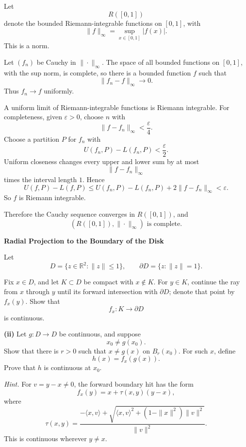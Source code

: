\begin{solution}
Let
\[
R([0,1])
\]
denote the bounded Riemann-integrable functions on \([0,1]\), with
\[
\|f\|_\infty=\sup_{x\in[0,1]}|f(x)|.
\]
This is a norm.

Let \((f_n)\) be Cauchy in \(\|\cdot\|_\infty\). The space of all bounded functions on
\([0,1]\), with the sup norm, is complete, so there is a bounded function \(f\) such that
\[
\|f_n-f\|_\infty\to0.
\]
Thus \(f_n\to f\) uniformly.

A uniform limit of Riemann-integrable functions is Riemann integrable. For completeness,
given \(\varepsilon>0\), choose \(n\) with
\[
\|f-f_n\|_\infty<\frac{\varepsilon}{4}.
\]
Choose a partition \(P\) for \(f_n\) with
\[
U(f_n,P)-L(f_n,P)<\frac{\varepsilon}{2}.
\]
Uniform closeness changes every upper and lower sum by at most
\[
\|f-f_n\|_\infty
\]
times the interval length \(1\). Hence
\[
U(f,P)-L(f,P)
\le
U(f_n,P)-L(f_n,P)
+
2\|f-f_n\|_\infty
<
\varepsilon.
\]
So \(f\) is Riemann integrable.

Therefore the Cauchy sequence converges in \(R([0,1])\), and
\[
\boxed{
(R([0,1]),\|\cdot\|_\infty)
\text{ is complete}.
}
\]
\end{solution}


\begin{problem}[CP-II-0508]
\label{prob:cp-ii-0508}
\textbf{Radial Projection to the Boundary of the Disk}

\hspace*{1.5em}Let
\[
D=\{z\in\mathbb R^2:\|z\|\le1\},
\qquad
\partial D=\{z:\|z\|=1\}.
\]


Fix \(x\in D\), and let \(K\subset D\) be compact with \(x\notin K\). For
\(y\in K\), continue the ray from \(x\) through \(y\) until its forward
intersection with \(\partial D\); denote that point by \(f_x(y)\). Show that
\[
f_x:K\to\partial D
\]
is continuous.

\par\smallskip\noindent\textbf{(ii)}\quad
Let \(g:D\to D\) be continuous, and suppose
\[
x_0\ne g(x_0).
\]
Show that there is \(r>0\) such that \(x\ne g(x)\) on \(B_r(x_0)\). For such
\(x\), define
\[
h(x)=f_x(g(x)).
\]
Prove that \(h\) is continuous at \(x_0\).

\medskip
\noindent\emph{Hint.} For \(v=y-x\ne0\), the forward boundary hit has the form
\[
f_x(y)=x+\tau(x,y)(y-x),
\]
where
\[
\tau(x,y)
=
\frac{-\langle x,v\rangle+
\sqrt{\langle x,v\rangle^2+(1-\|x\|^2)\|v\|^2}}
{\|v\|^2}.
\]
This is continuous wherever \(y\ne x\).
\end{problem}

